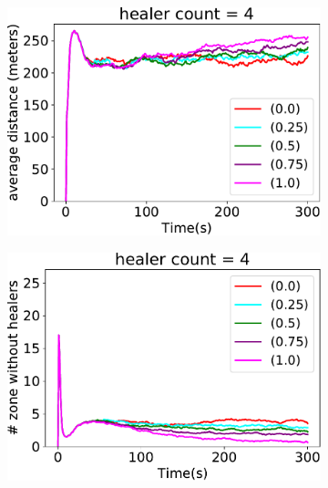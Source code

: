 \begin{figure}
\begin{subfigure}[b]{0.32\textwidth}
\includegraphics[width=\textwidth]{papers/mdpi2020/imgs/avg-distance-from-leader-4.pdf}
\end{subfigure}
\hfill
%
\begin{subfigure}[b]{0.32\textwidth}
\centering
\includegraphics[width=\textwidth]{papers/mdpi2020/imgs/empty-zone-4.pdf}
\end{subfigure}
\par\bigskip %
\centering
\begin{subfigure}[b]{0.32\textwidth}
\centering

\end{subfigure}
\end{figure}
